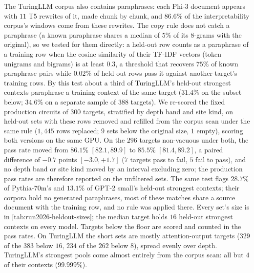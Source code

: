 \documentclass[10pt]{article}
\begin{document}
The TuringLLM corpus also contains paraphrases: each Phi-3 document appears with $11$ T5 rewrites of it, made chunk by chunk, and $86.6\%$ of the interpretability corpus's windows come from these rewrites.
The copy rule does not catch a paraphrase (a known paraphrase shares a median of $5\%$ of its 8-grams with the original), so we tested for them directly: a held-out row counts as a paraphrase of a training row when the cosine similarity of their TF-IDF vectors (token unigrams and bigrams) is at least $0.3$, a threshold that recovers $75\%$ of known paraphrase pairs while $0.02\%$ of held-out rows pass it against another target's training rows.
By this test about a third of TuringLLM's held-out strongest contexts paraphrase a training context of the same target ($31.4\%$ on the subset below; $34.6\%$ on a separate sample of $388$ targets).
We re-scored the fixed production circuits of $300$ targets, stratified by depth band and site kind, on held-out sets with these rows removed and refilled from the corpus scan under the same rule ($1{,}445$ rows replaced; $9$ sets below the original size, $1$ empty), scoring both versions on the same GPU.
On the $296$ targets non-vacuous under both, the pass rate moved from $86.1\%$ $[82.1, 89.9]$ to $85.5\%$ $[81.4, 89.2]$, a paired difference of $-0.7$ points $[-3.0, +1.7]$ ($7$ targets pass to fail, $5$ fail to pass), and no depth band or site kind moved by an interval excluding zero; the production pass rates are therefore reported on the unfiltered sets.
The same test flags $28.7\%$ of Pythia-70m's and $13.1\%$ of GPT-2 small's held-out strongest contexts; their corpora hold no generated paraphrases, most of these matches share a source document with the training row, and no rule was applied there.
Every set's size is in \cref{tab:run2026-heldout-sizes}; the median target holds $16$ held-out strongest contexts on every model.
Targets below the floor are scored and counted in the pass rates.
On TuringLLM the short sets are mostly attention-output targets ($329$ of the $383$ below $16$, $234$ of the $262$ below $8$), spread evenly over depth.
TuringLLM's strongest pools come almost entirely from the corpus scan: all but $4$ of their contexts ($99.999\%$).
\end{document}
